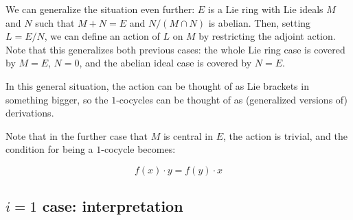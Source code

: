 \documentclass[10pt]{amsart}
\begin{document}
We can generalize the situation even further: $E$ is a Lie ring with
Lie ideals $M$ and $N$ such that $M + N = E$ and $N/(M \cap N)$ is
abelian. Then, setting $L = E/N$, we can define an action of $L$ on
$M$ by restricting the adjoint action. Note that this generalizes both
previous cases: the whole Lie ring case is covered by $M = E$, $N =
0$, and the abelian ideal case is covered by $N = E$.

In this general situation, the action can be thought of as Lie
brackets in something bigger, so the $1$-cocycles can be thought of as
(generalized versions of) derivations.

Note that in the further case that $M$ is central in $E$, the action
is trivial, and the condition for being a $1$-cocycle becomes:

$$f(x) \cdot y = f(y) \cdot x$$

\subsection{$i = 1$ case: interpretation}
\end{document}
